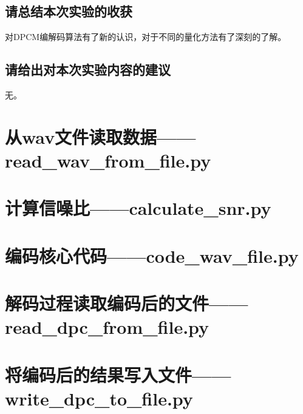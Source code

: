 \documentclass{hitreport}
\begin{document}
\subsection{请总结本次实验的收获}

对DPCM编解码算法有了新的认识，对于不同的量化方法有了深刻的了解。

\subsection{请给出对本次实验内容的建议}

无。

 
\renewcommand\refname{参考文献}
 
 

\newpage
\begin{appendices}

\section{从wav文件读取数据——read\_wav\_from\_file.py}



\section{计算信噪比——calculate\_snr.py}



\section{编码核心代码——code\_wav\_file.py}



\section{解码过程读取编码后的文件——read\_dpc\_from\_file.py}



\section{将编码后的结果写入文件——write\_dpc\_to\_file.py}



\end{appendices}
\end{document}
